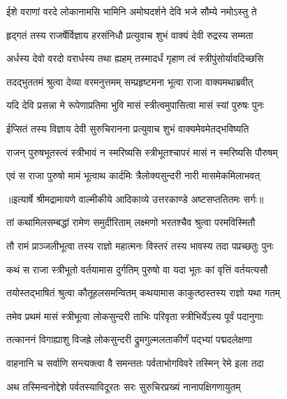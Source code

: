 \twolineshloka
{ईशे वराणां वरदे लोकानामसि भामिनि}
{अमोघदर्शने देवि भजे सौम्ये नमोऽस्तु ते} %

\twolineshloka
{हृद्गतं तस्य राजर्षेर्विज्ञाय हरसंनिधौ}
{प्रत्युवाच शुभं वाक्यं देवी रुद्रस्य सम्मता} %

\twolineshloka
{अर्धस्य देवो वरदो वरार्धस्य तथा ह्यहम्}
{तस्मादर्धं गृहाण त्वं स्त्रीपुंसोर्यावदिच्छसि} %

\twolineshloka
{तदद्भुततमं श्रुत्वा देव्या वरमनुत्तमम्}
{सम्प्रहृष्टमना भूत्वा राजा वाक्यमथाब्रवीत्} %

\twolineshloka
{यदि देवि प्रसन्ना मे रूपेणाप्रतिमा भुवि}
{मासं स्त्रीत्वमुपासित्वा मासं स्यां पुरुषः पुनः} %

\twolineshloka
{ईप्सितं तस्य विज्ञाय देवी सुरुचिरानना}
{प्रत्युवाच शुभं वाक्यमेवमेतद्भविष्यति} %

\twolineshloka
{राजन् पुरुषभूतस्त्वं स्त्रीभावं न स्मरिष्यसि}
{स्त्रीभूतश्चापरं मासं न स्मरिष्यसि पौरुषम्} %

\twolineshloka
{एवं स राजा पुरुषो मामं भूत्वाथ कार्दमिः}
{त्रैलोक्यसुन्दरी नारी मासमेकमिलाभवत्} %


{॥इत्यार्षे श्रीमद्रामायणे वाल्मीकीये आदिकाव्ये उत्तरकाण्डे अष्टसप्ततितमः सर्गः॥}


\twolineshloka
{तां कथामिलसम्बद्धां रामेण समुदीरिताम्}
{लक्ष्मणो भरतश्चैव श्रुत्वा परमविस्मितौ} %

\twolineshloka
{तौ रामं प्राञ्जलीभूत्वा तस्य राज्ञो महात्मनः}
{विस्तरं तस्य भावस्य तदा पप्रच्छतुः पुनः} %

\twolineshloka
{कथं स राजा स्त्रीभूतो वर्तयामास दुर्गतिम्}
{पुरुषो वा यदा भूतः कां वृत्तिं वर्तयत्यसौ} %

\twolineshloka
{तयोस्तद्भाषितं श्रुत्वा कौतूहलसमन्वितम्}
{कथयामास काकुत्ष्ठस्तस्य राज्ञो यथा गतम्} %

\twolineshloka
{तमेव प्रथमं मासं स्त्रीभूत्वा लोकसुन्दरी}
{ताभिः परिवृता स्त्रीभिर्येऽस्य पूर्वं पदानुगाः} %

\twolineshloka
{तत्काननं विगाह्याशु विजह्रे लोकसुन्दरी}
{द्रुमगुल्मलताकीर्णं पद्भ्यां पद्मदलेक्षणा} %

\twolineshloka
{वाहनानि च सर्वाणि सन्त्यक्त्वा वै समन्ततः}
{पर्वताभोगविवरे तस्मिन् रेमे इला तदा} %

\twolineshloka
{अथ तस्मिन्वनोद्देशे पर्वतस्याविदूरतः}
{सरः सुरुचिरप्रख्यं नानापक्षिगणायुतम्} %

